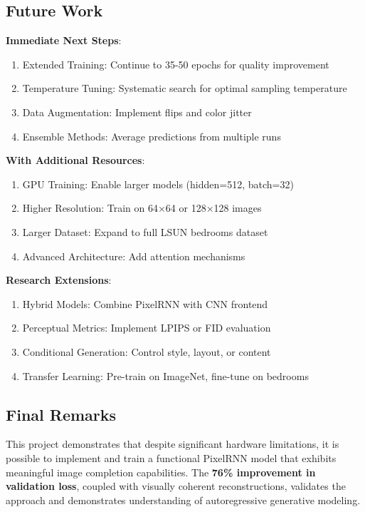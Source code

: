 \documentclass[12pt,a4paper]{article}
\begin{document}
\subsection{Future Work}

\textbf{Immediate Next Steps}:
\begin{enumerate}
    \item Extended Training: Continue to 35-50 epochs for quality improvement
    \item Temperature Tuning: Systematic search for optimal sampling temperature
    \item Data Augmentation: Implement flips and color jitter
    \item Ensemble Methods: Average predictions from multiple runs
\end{enumerate}

\textbf{With Additional Resources}:
\begin{enumerate}
    \item GPU Training: Enable larger models (hidden=512, batch=32)
    \item Higher Resolution: Train on 64×64 or 128×128 images
    \item Larger Dataset: Expand to full LSUN bedrooms dataset
    \item Advanced Architecture: Add attention mechanisms
\end{enumerate}

\textbf{Research Extensions}:
\begin{enumerate}
    \item Hybrid Models: Combine PixelRNN with CNN frontend
    \item Perceptual Metrics: Implement LPIPS or FID evaluation
    \item Conditional Generation: Control style, layout, or content
    \item Transfer Learning: Pre-train on ImageNet, fine-tune on bedrooms
\end{enumerate}

\subsection{Final Remarks}

This project demonstrates that despite significant hardware limitations, it is possible to implement and train a functional PixelRNN model that exhibits meaningful image completion capabilities. The \textbf{76\% improvement in validation loss}, coupled with visually coherent reconstructions, validates the approach and demonstrates understanding of autoregressive generative modeling.
\end{document}
